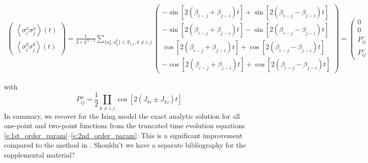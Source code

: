 \documentclass[aps,prl,showpacs,amsmath,amssymb,superscriptaddress,reprint,10pt]{revtex4-1}
\newcommand{\ar}[1]{{\color{analabha} #1}}
\begin{document}
\begin{bibunit}
\begin{widetext}
\begin{subequations}
\begin{align}
\begin{pmatrix}
        \left\langle\sigma_i^x\sigma_j^x\right\rangle(t)\\
        \left\langle\sigma_i^y\sigma_j^y\right\rangle(t)
       \end{pmatrix}    
 =\frac{1}{2\times4^{N-2}}\sum_{\{a_k^z,a_k^y\}\in S_{\text{1-1}},k\neq i,j}
\begin{pmatrix}
        -\sin\left[2(\beta_{i-j}+\beta_{j-i})t\right]+\sin\left[2(\beta_{i-j}-\beta_{j-i})t\right]\\
        -\sin\left[2(\beta_{i-j}+\beta_{j-i})t\right]-\sin\left[2(\beta_{i-j}-\beta_{j-i})t\right]\\
        \cos\left[2(\beta_{i-j}+\beta_{j-i})t\right]+\cos\left[2(\beta_{i-j}-\beta_{j-i})t\right]\\
        -\cos\left[2(\beta_{i-j}+\beta_{j-i})t\right]+\cos\left[2(\beta_{i-j}-\beta_{j-i})t\right]
       \end{pmatrix}
 =
 \begin{pmatrix}
        0\\
        0\\
        P_{ij}^-+P_{ij}^+\\
        P_{ij}^--P_{ij}^+
       \end{pmatrix}
\end{align}
\end{subequations}
\end{widetext}
with
\begin{equation}
P_{ij}^\pm=\frac{1}{2}\prod_{k\neq i,j}\cos\left[2(J_{ki}\pm J_{kj})t\right] 
\end{equation}
\ar{In summary, we recover for the Ising model the exact analytic solution for all one-point and two-point functions from the truncated time evolution equations} \eqref{e:1st_order_param}--\eqref{e:2nd_order_param}. This is a significant improvement compared to the method in \cite{Schachenmayer_etal15}. \ar{Shouldn't we have a separate bibliography for the supplemental material?}

%
\putbib
\end{bibunit}
\end{document}
